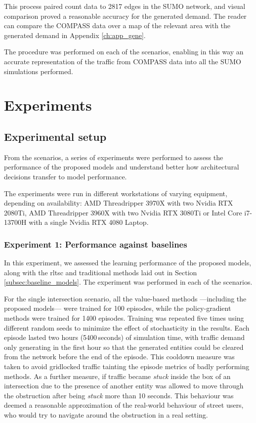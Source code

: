 \medskip

\noindent This process paired count data to 2817 edges in the SUMO network, and visual comparison proved a reasonable accuracy for the generated demand. The reader can compare the COMPASS data over a map of the relevant area with the generated demand in Appendix \ref{ch:app_gene}.

The procedure was performed on each of the scenarios, enabling in this way an accurate representation of the traffic from COMPASS data into all the SUMO simulations performed.

\section{Experiments} \label{sec:experiments}
\subsection{Experimental setup} \label{subsec:experimental_setup}

From the scenarios, a series of experiments were performed to assess the performance of the proposed models and understand better how architectural decisions transfer to model performance.

The experiments were run in different workstations of varying equipment, depending on availability: AMD Threadripper 3970X with two Nvidia RTX 2080Ti, AMD Threadripper 3960X with two Nvidia RTX 3080Ti or Intel Core i7-13700H with a single Nvidia RTX 4080 Laptop.

\subsubsection{Experiment 1: Performance against baselines} \label{subsubsec:exp_1}
In this experiment, we assessed the learning performance of the proposed models, along with the \gls{rltsc} and traditional methods laid out in Section \ref{subsec:baseline_models}. The experiment was performed in each of the scenarios.

\medskip

\noindent For the single intersection scenario, all the value-based methods —including the proposed models— were trained for 100 episodes, while the policy-gradient methods were trained for 1400 episodes. Training was repeated five times using different random seeds to minimize the effect of stochasticity in the results. Each episode lasted two hours (5400\,seconds) of simulation time, with traffic demand only generating in the first hour so that the generated entities could be cleared from the network before the end of the episode. This cooldown measure was taken to avoid gridlocked traffic tainting the episode metrics of badly performing methods. As a further measure, if traffic became \textit{stuck} inside the box of an intersection due to the presence of another entity was allowed to move through the obstruction after being \textit{stuck} more than 10 seconds. This behaviour was deemed a reasonable approximation of the real-world behaviour of street users, who would try to navigate around the obstruction in a real setting.

